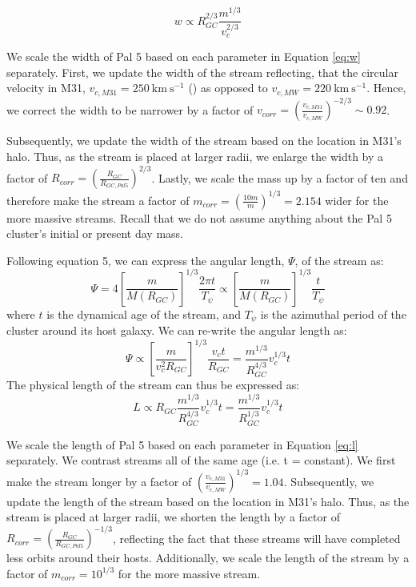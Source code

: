 \documentclass[twocolumn]{aastex62}
\newcommand{\kms}{\ensuremath{\textrm{km}~\textrm{s}^{-1}}}
\newcommand{\todo}[1]{{\color{red} TODO: #1}}
\begin{document}
\begin{equation}
\label{eq:w}
w \propto R_{GC}^{2/3} \frac{m^{1/3}}{v_c^{2/3}}
\end{equation}

We scale the width of Pal 5 based on each parameter in Equation \ref{eq:w} separately. First, we update the width of the stream reflecting, that the circular velocity in M31, $v_{c, M31}= 250 ~\kms$  (\citealt{chemin09}) as opposed to  $v_{c, MW}= 220 ~\kms$. Hence, we correct the width to be narrower by a factor of $v_{corr} =  \left(\frac{v_{c,M31}}{v_{c,MW}}\right)^{-2/3} \sim 0.92$. 

Subsequently, we update the width of the stream based on the location in M31's halo. Thus, as the stream is placed at larger radii, we enlarge the width by a factor of  $R_{corr} = \left(\frac{R_{GC}}{R_{GC,Pal5}}\right)^{2/3}$. Lastly, we scale the mass up by a factor of ten and therefore make the stream a factor of $m_{corr} = \left(\frac{10m}{m}\right)^{1/3}= 2.154$ wider for the more massive streams. Recall that we do not assume anything about the Pal 5 cluster's initial or present day mass. 


Following \citet{johnston01} equation 5, we can express the angular length, $\Psi$, of the stream as:
\begin{equation}
\Psi = 4  \left[\frac{m}{M(R_{GC})}\right]^{1/3}  \frac{2 \pi t}{T_{\psi}} \propto \left[\frac{m}{M(R_{GC})}\right]^{1/3}  \frac{t}{T_{\psi}}
\end{equation}
where $t$ is the dynamical age of the stream, and $T_{\psi}$ is the azimuthal period of the cluster around its host galaxy. We can re-write the angular length as:
\begin{equation}
\Psi \propto \left[\frac{m }{v_c^2 R_{GC}}\right]^{1/3}  \frac{v_c t }{R_{GC}} = \frac{m^{1/3}}{R_{GC}^{4/3}} v_c^{1/3}t
\end{equation}
The physical length of the stream can thus be expressed as:
\begin{equation}
\label{eq:l}
L \propto R_{GC} \frac{m^{1/3}}{R_{GC}^{4/3}} v_c^{1/3}t = \frac{m^{1/3}}{R_{GC}^{1/3}} v_c^{1/3}t
\end{equation}

We scale the length of Pal 5 based on each parameter in Equation \ref{eq:l} separately. We contrast streams all of the same age (i.e.  t = constant). We first make the stream longer by a factor of $(\frac{v_{c,M31}}{v_{c,MW}})^{1/3} = 1.04$. Subsequently, we update the length of the stream based on the location in M31's halo. Thus, as the stream is placed at larger radii, we shorten the length by a factor of  $R_{corr} = \left(\frac{R_{GC}}{R_{GC,Pal5}}\right)^{-1/3}$, reflecting the fact that these streams will have completed less orbits around their hosts. %
Additionally, we scale the length of the stream by a factor of $m_{corr} = 10^{1/3}$ for the more massive stream. 
\end{document}
